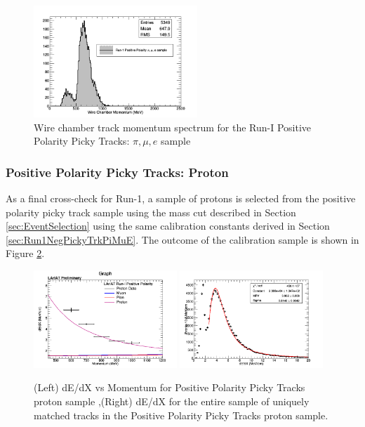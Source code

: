 \begin{figure}[htb]
\centering
\includegraphics[width=0.55\textwidth]{images/WCTrkMomentumRun1PosPiMuE.png}
\caption{Wire chamber track momentum spectrum for the Run-I Positive Polarity Picky Tracks: $\pi, \mu, e$ sample  }
\label{fig:Run1PosPickyTrkPiMuEMomentumSpec}
\end{figure}

\subsubsection{Positive Polarity Picky Tracks: Proton}\label{sec:Run1PosPickyTrkProton}
\newpage

As a final cross-check for Run-1, a sample of protons is selected from the positive polarity picky track sample using the mass cut described in Section \ref{sec:EventSelection} using the same calibration constants derived in Section \ref{sec:Run1NegPickyTrkPiMuE}. The outcome of the calibration sample is shown in Figure \ref{fig:Run1PosPickyTrkProtonResults}.

\begin{figure}[htb]
\centering
\includegraphics[width=0.48\textwidth]{images/dEdXvsMomentumPosPolRun1ProtonFineBin.png}
\includegraphics[width=0.48\textwidth]{images/dEdXNegPolRun1Proton.png}
\caption{(Left) dE/dX vs Momentum for Positive Polarity Picky Tracks proton sample ,(Right) dE/dX for the entire sample of uniquely matched tracks in the Positive Polarity Picky Tracks proton sample.}
\label{fig:Run1PosPickyTrkProtonResults}
\end{figure}

